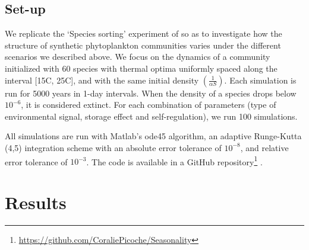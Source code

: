 \documentclass[a4paper,12pt]{article}
\begin{document}
\subsection*{Set-up}

We replicate the `Species sorting' experiment of \citet{scranton_coexistence_2016}
so as to investigate how the structure of synthetic phytoplankton
communities varies under the different scenarios we described above.
We focus on the dynamics of a community initialized with 60 species
with thermal optima uniformly spaced along the interval {[}15\textdegree C, 25\textdegree C{]},
and with the same initial density $\left(\frac{\ensuremath{1}}{\alpha S}\right)$.
Each simulation is run for 5000 years in 1-day intervals. When the
density of a species drops below $10^{-6}$, it is considered extinct.
For each combination of parameters (type of environmental signal,
storage effect and self-regulation), we run 100 simulations.

All simulations are run with Matlab's ode45 algorithm, an adaptive
Runge-Kutta (4,5) integration scheme with an absolute error tolerance
of $10^{-8}$, and relative error tolerance of $10^{-3}$. The code
is available in a GitHub repository\footnote{\url{https://github.com/CoraliePicoche/Seasonality}}
.

\section{Results}
\end{document}

